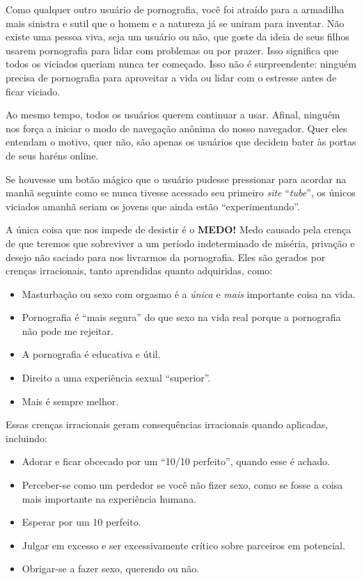 \documentclass[
  spanish,
  openany]{book}
\begin{document}
Como qualquer outro usuário de pornografia, você foi atraído para a armadilha mais sinistra e sutil que o homem e a natureza já se uniram para inventar. Não existe uma pessoa viva, seja um usuário ou não, que goste da ideia de seus filhos usarem pornografia para lidar com problemas ou por prazer. Isso significa que todos os viciados queriam nunca ter começado. Isso não é surpreendente: ninguém precisa de pornografia para aproveitar a vida ou lidar com o estresse antes de ficar viciado.

Ao mesmo tempo, todos os usuários querem continuar a usar. Afinal, ninguém nos força a iniciar o modo de navegação anônima do nosso navegador. Quer eles entendam o motivo, quer não, são apenas os usuários que decidem bater às portas de seus haréns online.

Se houvesse um botão mágico que o usuário pudesse pressionar para acordar na manhã seguinte como se nunca tivesse acessado seu primeiro \emph{site} ``\emph{tube}'', os únicos viciados amanhã seriam os jovens que ainda estão ``experimentando''.

A única coisa que nos impede de desistir é o \textbf{MEDO!} Medo causado pela crença de que teremos que sobreviver a um período indeterminado de miséria, privação e desejo não saciado para nos livrarmos da pornografia. Eles são gerados por crenças irracionais, tanto aprendidas quanto adquiridas, como:

\begin{itemize}
\item
  Masturbação ou sexo com orgasmo é a \emph{única} e \emph{mais} importante coisa na vida.
\item
  Pornografia é ``mais segura'' do que sexo na vida real porque a pornografia não pode me rejeitar.
\item
  A pornografia é educativa e útil.
\item
  Direito a uma experiência sexual ``superior''.
\item
  Mais é sempre melhor.
\end{itemize}

Essas crenças irracionais geram consequências irracionais quando aplicadas, incluindo:

\begin{itemize}
\item
  Adorar e ficar obcecado por um ``10/10 perfeito'', quando esse é achado.
\item
  Perceber-se como um perdedor se você não fizer sexo, como se fosse a coisa mais importante na experiência humana.
\item
  Esperar por um 10 perfeito.
\item
  Julgar em excesso e ser excessivamente crítico sobre parceiros em potencial.
\item
  Obrigar-se a fazer sexo, querendo ou não.
\end{itemize}
\end{document}
